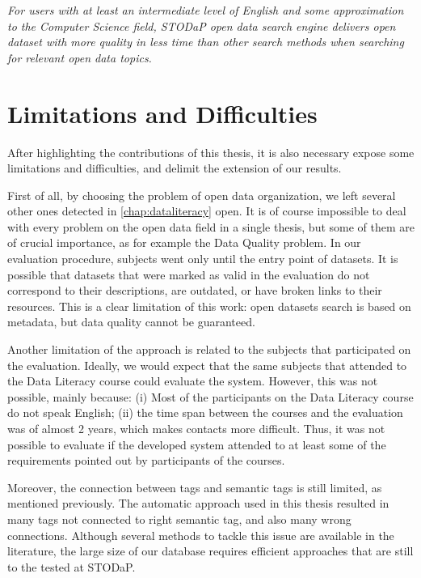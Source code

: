 \noindent \emph{For users with at least an intermediate level of English and some approximation to the Computer Science field, STODaP open data search engine delivers open dataset with more quality in less time than other search methods when searching for relevant open data topics.}

\section{Limitations and Difficulties}

After highlighting the contributions of this thesis, it is also necessary expose some limitations and difficulties, and delimit the extension of our results.

First of all, by choosing the problem of open data organization, we left several other ones detected in \autoref{chap:dataliteracy} open.
It is of course impossible to deal with every problem on the open data field in a single thesis, but some of them are of crucial importance, as for example the Data Quality problem.
In our evaluation procedure, subjects went only until the entry point of datasets.
It is possible that datasets that were marked as valid in the evaluation do not correspond to their descriptions, are outdated, or have broken links to their resources.
This is a clear limitation of this work: open datasets search is based on metadata, but data quality cannot be guaranteed.

Another limitation of the approach is related to the subjects that participated on the evaluation.
Ideally, we would expect that the same subjects that attended to the Data Literacy course could evaluate the system.
However, this was not possible, mainly because: (i) Most of the participants on the Data Literacy course do not speak English; (ii) the time span between the courses and the evaluation was of almost 2 years, which makes contacts more difficult.
Thus, it was not possible to evaluate if the developed system attended to at least some of the requirements pointed out by participants of the courses.

Moreover, the connection between tags and semantic tags is still limited, as mentioned previously.
The automatic approach used in this thesis resulted in many tags not connected to right semantic tag, and also many wrong connections. 
Although several methods to tackle this issue are available in the literature, the large size of our database requires efficient approaches that are still to the tested at STODaP.

